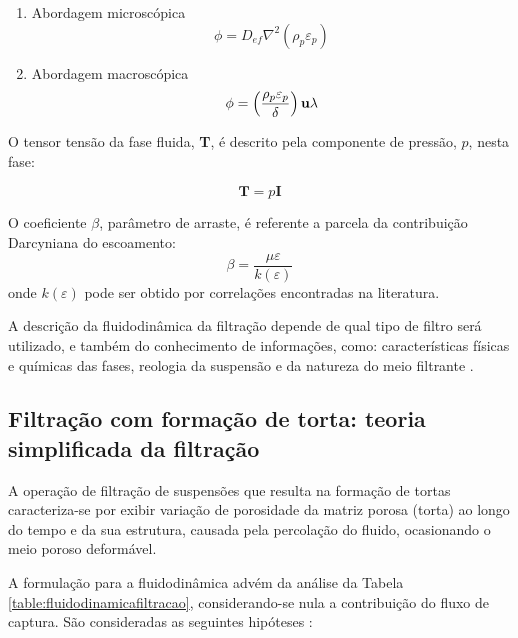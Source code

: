 \begin{enumerate}
\item[] Abordagem microscópica
  \begin{equation}
    \phi = D_{ef} \nabla^2(\rho_p\varepsilon_p)
  \end{equation}
  
\item[] Abordagem macroscópica
  \begin{equation}
    \phi = \left(\frac{\rho_p\varepsilon_p}{\delta} \right)\textbf{u}{}\lambda
  \end{equation}
\end{enumerate}

O tensor tensão da fase fluida, \textbf{T}, é descrito pela componente de
pressão, $p$, nesta fase:

\begin{equation}
  \label{eq:tensortensao}
  \textbf{T} = p \textbf{I}
\end{equation}

O coeficiente $\beta$, parâmetro de arraste, é referente a parcela da
contribuição Darcyniana do escoamento:
\begin{equation}
  \label{eq:parametroB}
  \beta = \frac{\mu\varepsilon}{k(\varepsilon)}
\end{equation}
onde $k(\varepsilon)$ pode ser obtido por correlações encontradas na literatura.

A descrição da fluidodinâmica da filtração depende de qual tipo de filtro será
utilizado, e também do conhecimento de informações, como: características
físicas e químicas das fases, reologia da suspensão e da natureza do meio
filtrante .

\subsection{Filtração com formação de torta: teoria simplificada da filtração}

A operação de filtração de suspensões que resulta na formação de tortas
caracteriza-se por exibir variação de porosidade da matriz porosa (torta) ao
longo do tempo e da sua estrutura, causada pela percolação do fluido,
ocasionando o meio poroso deformável.

A formulação para a fluidodinâmica advém da análise da Tabela
\ref{table:fluidodinamicafiltracao}, considerando-se nula a contribuição do
fluxo de captura. São consideradas as seguintes hipóteses
:

